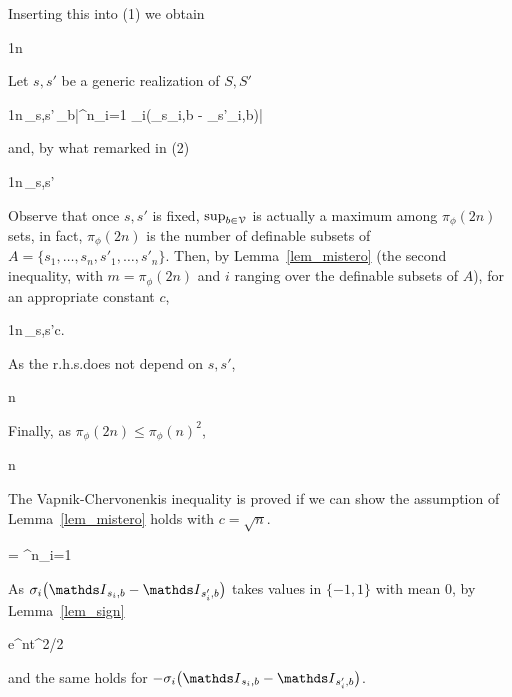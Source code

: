 \documentclass[scombinatorics.tex]{subfiles}
\begin{document}
  Inserting this into (1) we obtain

  {\le}
  {\frac1n\,\Ex\bigg[\sup_{b\in\V}\Ex\bigg|\sum^n_{i=1} \sigma_i\Big(\Indicator_{S_i,b} -  \Indicator_{S'_i,b}\Big)\ \Big|\ S,S'\bigg|\bigg]}

  Let $s,s'$ be a generic realization of $S,S'$

  \ceq{}
  {\le}
  {\frac1n\,\sup_{s,s'}\,\sup_{b\in\V}\Ex\bigg|\sum^n_{i=1} \sigma_i\big(\Indicator_{s_i,b} -  \Indicator_{s'_i,b}\big)\bigg|}

  and, by what remarked in (2)

  \ceq{}
  {\le}
  {\frac1n\,\sup_{s,s'}\Ex\bigg[\sup_{b\in\V}\bigg|\sum^n_{i=1} \sigma_i\big(\Indicator_{s_i,b} -  \Indicator_{s'_i,b}\big)\bigg|\bigg]}

  Observe that once $s,s'$ is fixed, $\sup_{b\in\EuScript V}$ is actually a maximum among $\pi_\phi(2n)$ sets, in fact, $\pi_\phi(2n)$ is the number of definable subsets of $A=\{s_1,\dots,s_n,s'_1,\dots,s'_n\}$.
  Then, by Lemma~\ref{lem_mistero} (the second inequality, with $m =\pi_\phi(2n)$ and $i$ ranging over the definable subsets of $A$), for an appropriate constant $c$,

  \ceq{}
  {\le}
  {\frac1n\,\sup_{s,s'}c.}

  As the r.h.s.\@ does not depend on $s,s'$,

  \ceq{}
  {\le}
  {n}

  Finally, as $\pi_\phi(2n)\le\pi_\phi(n)^2$,

  \ceq{}
  {\le}
  {n}
  
  The Vapnik-Chervonenkis inequality is proved if we can show the assumption of Lemma~\ref{lem_mistero} holds with $c=\sqrt{n}$.\smallskip

  \ceq{\hfill\Ex\bigg[\exp\bigg(t\sum^n_{i=1} \sigma_i\big(\Indicator_{s_i,b} -  \Indicator_{s'_i,b}\big)\bigg)\bigg]}
  {=}
  {\prod^n_{i=1} \Ex{}}
  \smallskip

  As $\sigma_i\big(\Indicator_{s_i,b} -  \Indicator_{s'_i,b}\big)$ takes values in $\{-1,1\}$ with mean $0$, by Lemma~\ref{lem_sign}

  \ceq{}
  {\le}
  {e^{nt^2/2}}

  and the same holds for $-\sigma_i\big(\Indicator_{s_i,b} -  \Indicator_{s'_i,b}\big)$.%
\QED
\end{document}
